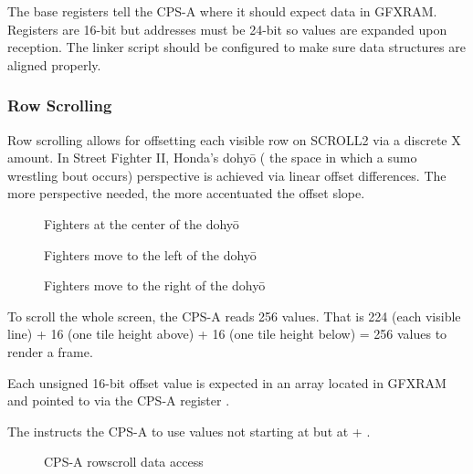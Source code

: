 The base registers tell the CPS-A where it should expect data in GFXRAM. Registers are 16-bit but addresses must be 24-bit so values are expanded  upon reception. The linker script should be configured to make sure data structures are aligned properly.

\subsubsection{Row Scrolling}
Row scrolling allows for offsetting each visible row on SCROLL2 via a discrete X amount. In Street Fighter II, Honda's dohyō ( the space in which a sumo wrestling bout occurs) perspective is achieved via linear offset differences. The more perspective needed, the more accentuated the offset slope. 

\begin{figure}[H]
\caption*{Fighters at the center of the dohyō}
 \end{figure}%

\begin{figure}[H]
\caption*{Fighters move to the left of the dohyō}
 \end{figure}%

\begin{figure}[H]
\caption*{Fighters move to the right of the dohyō}
 \end{figure}%

To scroll the whole screen, the CPS-A reads 256 values. That is 224 (each visible line) + 16 (one tile height above) + 16 (one tile height below) = 256 values to render a frame.

Each unsigned 16-bit offset value is expected in an array located in GFXRAM and pointed to via the CPS-A register .

The  instructs the CPS-A to use values not starting at  but at  + . 

\begin{figure}[H]
 \caption*{CPS-A rowscroll data access}%
 \end{figure}%



